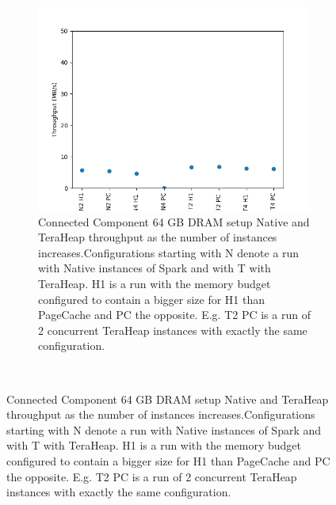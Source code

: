 \begin{figure}[htbp]
\begin{subfigure}[b]{0.48\textwidth}
        \includegraphics[width=\linewidth]{./fig/CC_64_THR.png}
    \caption{Connected Component 64 GB DRAM setup Native and TeraHeap
    throughput as the number of instances increases.Configurations
    starting with N denote a run with Native instances of Spark and
    with T with TeraHeap. H1 is a run with the memory budget
    configured to contain a bigger size for H1 than PageCache and PC
    the opposite. E.g. T2 PC is a run of 2 concurrent TeraHeap
    instances with exactly the same configuration. }
		\label{fig:cc_64_thr}
	\end{subfigure}\\[1em]
\end{figure}

